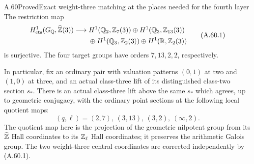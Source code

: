 \begin{statement}{A.60}{Proved}{Exact weight-three matching at the places needed for the fourth layer}
The restriction map
\[
 \begin{split}
 H^1_{\rm cts}(G_\mathbb Q,\widehat{\mathbb Z}(3))\longrightarrow{}&
 H^1(\mathbb Q_2,\mathbb Z_7(3))\oplus H^1(\mathbb Q_3,\mathbb Z_{13}(3))\\
 &\oplus H^1(\mathbb Q_3,\mathbb Z_2(3))\oplus H^1(\mathbb R,\mathbb Z_2(3))
 \end{split}
 \tag{A.60.1}
\]
is surjective.  The four target groups have orders
$7,13,2,2$, respectively.

In particular, fix an ordinary pair with valuation patterns
$(0,1)$ at two and $(1,0)$ at three, and an actual
class-three lift of its distinguished class-two section $s_*$.
There is an actual class-three lift above the same $s_*$
which agrees, up to geometric conjugacy, with the ordinary
point sections at the following local quotient maps:
\[
 (q,\ell)=(2,7),\ (3,13),\ (3,2),\ (\infty,2).
 \tag{A.60.2}
\]
The quotient map here is the projection of the geometric
nilpotent group from its $\widehat{\mathbb Z}$ Hall coordinates to
its $\mathbb Z_\ell$ Hall coordinates; it preserves the arithmetic
Galois group.  The two weight-three central coordinates
are corrected independently by (A.60.1).
\end{statement}

